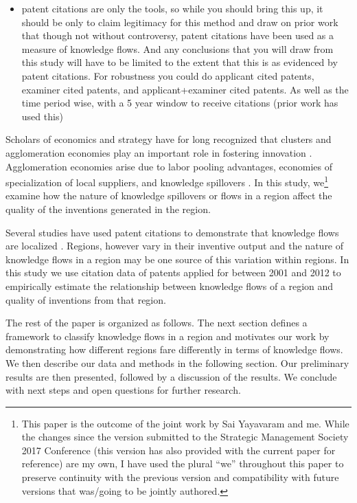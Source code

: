 \documentclass[12pt,letterpaper]{article}
\begin{document}
\begin{itemize}
\item patent citations are only the tools, so while you should bring this up, it should be only to claim legitimacy for this method and draw on prior work that though not without controversy, patent citations have been used as a measure of knowledge flows. And any conclusions that you will draw from this study will have to be limited to the extent that this is as evidenced by patent citations. For robustness you could do  applicant cited patents, examiner cited patents, and applicant+examiner cited patents. As well as the time period wise, with a 5 year window to receive citations (prior work has used this)
\end{itemize}

Scholars of economics and strategy have for long recognized that clusters and agglomeration economies play an important role in fostering innovation \citep{Marshall1890, Porter1990}. Agglomeration economies arise due to labor pooling advantages, economies of specialization of local suppliers, and knowledge spillovers \citep{Porter1990, Krugman1991a}. In this study, we\footnote{This paper is the outcome of the joint work by Sai Yayavaram and me. While the changes since the version submitted to the Strategic Management Society 2017 Conference (this version has also provided with the current paper for reference) are my own, I have used the plural ``we'' throughout this paper to preserve continuity with the previous version and compatibility with future versions that was/going to be jointly authored.} examine how the nature of knowledge spillovers or flows in a region affect the quality of the inventions generated in the region.\par
Several studies have used patent citations to demonstrate that knowledge flows are localized \citep*{Jaffe1993, Almeida1999, Alcacer2006a}. Regions, however vary in their inventive output \citep*{Agrawal2014b} and the nature of knowledge flows in a region may be one source of this variation within regions. In this study we use citation data of patents applied for between 2001 and 2012 to empirically estimate the relationship between knowledge flows of a region and quality of inventions from that region. \par
The rest of the paper is organized as follows. The next section defines a framework to classify knowledge flows in a region and motivates our work by demonstrating how different regions fare differently in terms of knowledge flows. We then describe our data and methods in the following section. Our preliminary results are then presented, followed by a discussion of the results. We conclude with next steps and open questions for further research.
\end{document}
